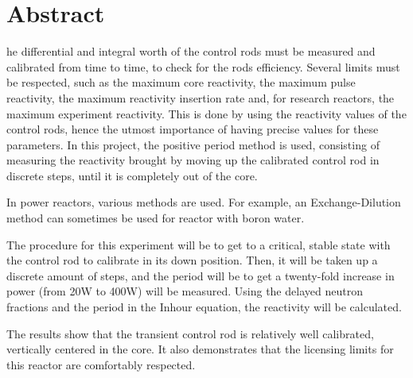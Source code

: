 %
%
%

\chapter*{Abstract}
\begin{SingleSpace}
he differential and integral worth of the control rods must be measured and calibrated from time to time, to check for the rods efficiency. Several limits must be respected, such as the maximum core reactivity, the maximum pulse reactivity, the maximum reactivity insertion rate and, for research reactors, the maximum experiment reactivity. This is done by using the reactivity values of the control rods, hence the utmost importance of having precise values for these parameters. In this project, the positive period method is used, consisting of measuring the reactivity brought by moving up the calibrated control rod in discrete steps, until it is completely out of the core.

In power reactors, various methods are used. For example, an Exchange-Dilution method can sometimes be used for reactor with boron water.

The procedure for this experiment will be to get to a critical, stable state with the control rod to calibrate in its down position. Then, it will be taken up a discrete amount of steps, and the period will be to get a twenty-fold increase in power (from 20W to 400W) will be measured. Using the delayed neutron fractions and the period in the Inhour equation, the reactivity will be calculated.

The results show that the transient control rod is relatively well calibrated, vertically centered in the core. It also demonstrates that the licensing limits for this reactor are comfortably respected.
\end{SingleSpace}
\clearpage
